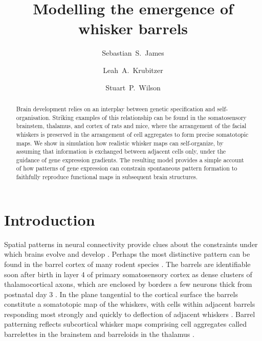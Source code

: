 \documentclass[9pt,lineno]{elife}
\title{Modelling the emergence of whisker barrels}
\author[1*]{Sebastian~S.~James}
\author[2]{Leah~A.~Krubitzer}
\author[1]{Stuart~P.~Wilson}
\affil[1]{Department of Psychology, The University of Sheffield, Sheffield, United Kingdom.}
\affil[2]{Center for Neuroscience, The University of California, Davis, United States.}
\begin{document}
\maketitle

\begin{abstract}
Brain development relies on an interplay between genetic specification and
self-organisation. Striking examples of this relationship can be found in the
somatosensory brainstem, thalamus, and cortex of rats and mice, where the
arrangement of the facial whiskers is preserved in the arrangement of cell
aggregates to form precise somatotopic maps. We show in simulation how
realistic whisker maps can self-organize, by assuming that information is
exchanged between adjacent cells only, under the guidance of gene expression
gradients. The resulting model provides a simple account of how patterns of
gene expression can constrain spontaneous pattern formation to faithfully
reproduce functional maps in subsequent brain structures.
\end{abstract}

\newcommand{\cmnt}[1]{\textcolor{blue}{#1}}
\newcommand{\dvrg}{\nabla\vcdot\nabla}
\newcommand{\e}{\emph}
\newcommand{\bol}{\textbf}
\newcommand{\mb}[1]{\mathbf{#1}}
\makeatletter
\newcommand*\vcdot{\mathpalette\vcdot@{.35}}
\newcommand*\vcdot@[2]{\mathbin{\vcenter{\hbox{\scalebox{#2}{$\m@th#1\bullet$}}}}}
\newcommand{\code}[1]{\textsf{#1}}


\section{Introduction}

Spatial patterns in neural connectivity provide clues about the constraints
under which brains evolve and develop \citep{purves_iterated_1992}. Perhaps
the most distinctive pattern can be found in the barrel cortex of many rodent
species \citep{woolsey_structural_1970}. The barrels are identifiable soon
after birth in layer 4 of primary somatosensory cortex as dense clusters of
thalamocortical axons, which are enclosed by borders a few neurons thick from
postnatal day 3 \citep{erzurumlu_development_2012}. In the plane tangential to
the cortical surface the barrels constitute a somatotopic map of the whiskers,
with cells within adjacent barrels responding most strongly and quickly to
deflection of adjacent whiskers \citep{armstrong-james_flow_1992}. Barrel
patterning reflects subcortical whisker maps comprising cell aggregates called
barrelettes in the brainstem and barreloids in the thalamus
\citep{ma_barrelettesarchitectonic_1991,van_der_loos_barreloids_1976}.
\end{document}
